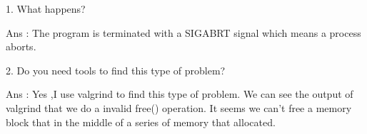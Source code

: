 \documentclass[10pt, answers]{exam}
\begin{document}
\begin{questions}
\begin{solution}
    1. What happens?
    
    Ans : The program is terminated with a SIGABRT signal which means 
    a process aborts.

    2. Do you need tools to find this type of problem?

    Ans : Yes ,I use valgrind to find this type of problem.
    We can see the output of valgrind that we do a invalid free() operation.
    It seems we can't free a memory block that in the 
    middle of a series of memory that allocated.

    \end{solution}
    
    
    
    \end{questions}
\end{document}
